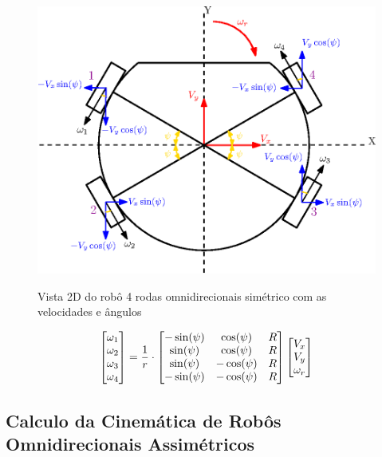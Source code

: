 \documentclass[deposito, acronym, symbols]{fei}
\begin{document}
\begin{figure}[!htb]
    \centering
    \caption{Vista 2D do robô 4 rodas omnidirecionais simétrico com as velocidades e ângulos}
    \includegraphics[scale=1]{Imagens/Omini_wheels_simetric.eps}
    \label{fig:cin_simetrica}
\end{figure}


\begin{equation} \label{eq:simetrica}
\centering  
\begin{bmatrix}\omega_1\\\omega_2\\\omega_3\\\omega_4\end{bmatrix} = \frac{1}{r} \cdot 
   \begin{bmatrix}-\sin(\psi)&\cos(\psi)&R\\
   \sin(\psi)&\cos(\psi)&R\\
   \sin(\psi)&-\cos(\psi)&R\\
   -\sin(\psi)&-\cos(\psi)&R \end{bmatrix}
   \begin{bmatrix}V_x\\V_y\\\omega_r\end{bmatrix}  
\end{equation}

 

\subsection{Calculo da Cinemática de Robôs Omnidirecionais Assimétricos}
\end{document}

